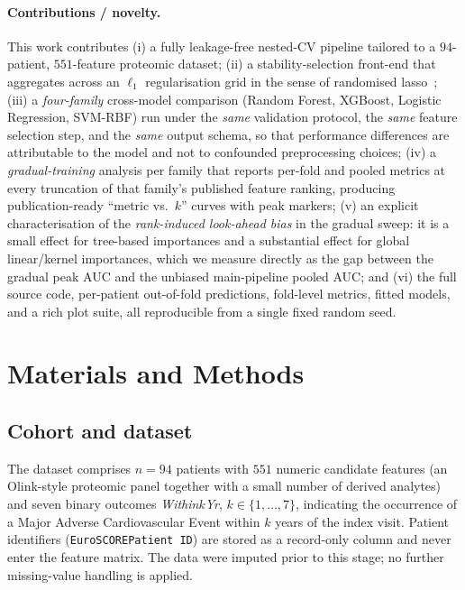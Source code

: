 \documentclass[11pt,a4paper]{article}
\begin{document}
\paragraph{Contributions / novelty.}
This work contributes (i) a fully leakage-free nested-CV pipeline tailored
to a $94$-patient, $551$-feature proteomic dataset; (ii) a stability-selection
front-end that aggregates across an $\ell_1$ regularisation grid in the
sense of randomised lasso~\cite{}; (iii) a \emph{four-family} cross-model
comparison (Random Forest, XGBoost, Logistic Regression, SVM-RBF) run
under the \emph{same} validation protocol, the \emph{same} feature
selection step, and the \emph{same} output schema, so that performance
differences are attributable to the model and not to confounded preprocessing
choices; (iv) a \emph{gradual-training} analysis per family that reports
per-fold and pooled metrics at every truncation of that family's published
feature ranking, producing publication-ready ``metric vs.\ $k$'' curves
with peak markers; (v) an explicit characterisation of the
\emph{rank-induced look-ahead bias} in the gradual sweep: it is a small
effect for tree-based importances and a substantial effect for global
linear/kernel importances, which we measure directly as the gap between
the gradual peak AUC and the unbiased main-pipeline pooled AUC; and (vi)
the full source code, per-patient out-of-fold predictions, fold-level
metrics, fitted models, and a rich plot suite, all reproducible from a
single fixed random seed.

\section{Materials and Methods}
\label{sec:methods}

\subsection{Cohort and dataset}
The dataset comprises $n=94$ patients with $551$ numeric candidate features
(an Olink-style proteomic panel together with a small number of derived
analytes) and seven binary outcomes \emph{Within$k$Yr}, $k\in\{1,\dots,7\}$,
indicating the occurrence of a Major Adverse Cardiovascular Event
within $k$ years of the index visit. Patient identifiers (\texttt{EuroSCOREPatient
ID}) are stored as a record-only column and never enter the feature
matrix. The data were imputed prior to this stage; no further
missing-value handling is applied.
\end{document}
